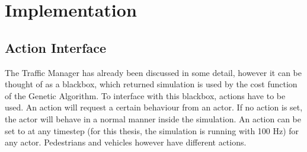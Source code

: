 \chapter{Implementation}
\section{Action Interface}
\label{implementation:action_interface}
The Traffic Manager has already been discussed in some detail, however it can be thought of as a blackbox, which returned simulation is used by the cost function of the Genetic Algorithm.
To interface with this blackbox, actions have to be used. An action will request a certain behaviour from an actor. If no action is set, the actor will behave in a normal manner inside the simulation. An action can be set to at any timestep (for this thesis, the simulation is running with 100 Hz) for any actor. Pedestrians and vehicles however have different actions.

